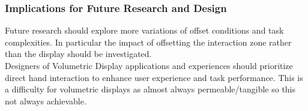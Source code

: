 \subsubsection{Implications for Future Research and Design}
Future research should explore more variations of offset conditions and task complexities. In particular the impact of offsetting the interaction zone rather than the display should be investigated.  \\

Designers of Volumetric Display applications and experiences should prioritize direct hand interaction to enhance user experience and task performance. This is a difficulty for volumetric displays as almost always permeable/tangible so this not always achievable. \\